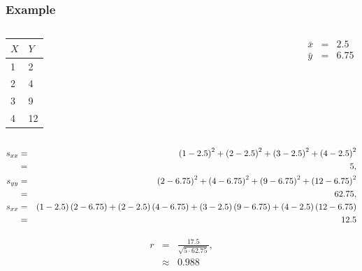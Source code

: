 \begin{frame}
  \frametitle{Example}
  \vspace*{-1em}
  \begin{columns}

    \begin{tabular}{l|l}
      $X$ & $Y$ \\ \hline
      1 & 2 \\
      2 & 4  \\
      3 & 9 \\
      4 & 12
    \end{tabular}


    \vfill


    {
      \begin{eqnarray*}
        \bar{x} & = & 2.5 \\
        \bar{y} & = & 6.75
      \end{eqnarray*}
    }

    \vfill

  \end{columns}

  {
    \begin{eqnarray*}
      s_{xx} & = & \left( 1-2.5\right)^2 + \left( 2 - 2.5 \right)^2 + \left( 3 - 2.5 \right)^2 + \left( 4 - 2.5 \right)^2 \\
            & = & 5, \\
      s_{yy} & = & \left( 2-6.75\right)^2 + \left( 4 - 6.75 \right)^2 + \left( 9 - 6.75 \right)^2 + \left( 12 - 6.75 \right)^2 \\
            & = & 62.75, \\
      s_{xx} & = & \left( 1-2.5\right)\left( 2-6.75\right) + \left( 2 - 2.5 \right)\left( 4 - 6.75 \right) + \left( 3 - 2.5 \right)\left( 9 - 6.75 \right) + \left( 4 - 2.5 \right)\left( 12 - 6.75 \right) \\
            & = & 12.5
    \end{eqnarray*}
  } 

  {
    \begin{eqnarray*}
      r & = & \frac{17.5}{\sqrt{5\cdot 62.75}}, \\
        & \approx & 0.988
    \end{eqnarray*}
  }


\end{frame}



